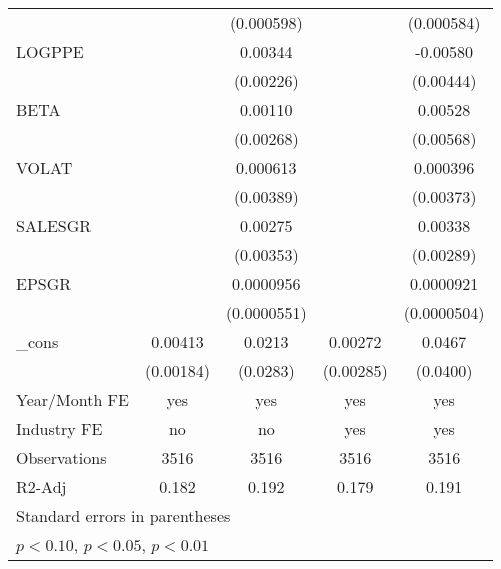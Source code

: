 \begin{table}[htbp]
\begin{tabular}{l*{4}{c}}
                &                  &(0.000598)         &                  &(0.000584)         \\
LOGPPE          &                  &  0.00344         &                  & -0.00580         \\
                &                  &(0.00226)         &                  &(0.00444)         \\
BETA            &                  &  0.00110         &                  &  0.00528         \\
                &                  &(0.00268)         &                  &(0.00568)         \\
VOLAT           &                  & 0.000613         &                  & 0.000396         \\
                &                  &(0.00389)         &                  &(0.00373)         \\
SALESGR         &                  &  0.00275         &                  &  0.00338         \\
                &                  &(0.00353)         &                  &(0.00289)         \\
EPSGR           &                  &0.0000956\sym{*}  &                  &0.0000921\sym{*}  \\
                &                  &(0.0000551)         &                  &(0.0000504)         \\
\_cons          &  0.00413\sym{**} &   0.0213         &  0.00272         &   0.0467         \\
                &(0.00184)         & (0.0283)         &(0.00285)         & (0.0400)         \\
\hline
Year/Month FE   &      yes         &      yes         &      yes         &      yes         \\
Industry FE     &       no         &       no         &      yes         &      yes         \\
Observations    &     3516         &     3516         &     3516         &     3516         \\
R2-Adj          &    0.182         &    0.192         &    0.179         &    0.191         \\
\hline\hline
\multicolumn{5}{l}{\footnotesize Standard errors in parentheses}\\
\multicolumn{5}{l}{\footnotesize \sym{*} \(p<0.10\), \sym{**} \(p<0.05\), \sym{***} \(p<0.01\)}\\
\end{tabular}
\end{table}
